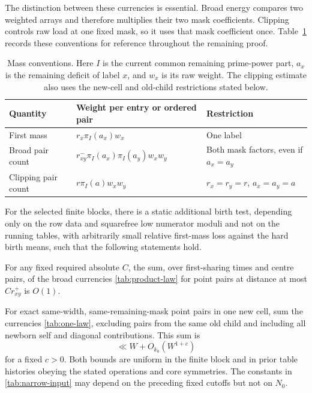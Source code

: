 The distinction between these currencies is essential. Broad energy
compares two weighted arrays and therefore multiplies their two mask
coefficients. Clipping controls raw load at one fixed mask, so it
uses that mask coefficient once. Table~\ref{tab:currency-map} records
these conventions for reference throughout the remaining proof.

\begin{table}[htbp]
\centering
\renewcommand{\arraystretch}{1.2}
\begin{tabular}{@{}p{.25\linewidth}p{.40\linewidth}p{.27\linewidth}@{}}
\toprule
Quantity & Weight per entry or ordered pair & Restriction \\
\midrule
First mass & $r_x\pi_I(a_x)w_x$ & One label \\
Broad pair count & $r_{xy}^-\pi_I(a_x)\pi_I(a_y)w_xw_y$
  & Both mask factors, even if $a_x=a_y$ \\
Clipping pair count & $r\pi_I(a)w_xw_y$
  & $r_x=r_y=r$, $a_x=a_y=a$ \\
\bottomrule
\end{tabular}
\caption{Mass conventions. Here $I$ is the current common remaining
prime-power part, $a_x$ is the remaining deficit of label $x$, and
$w_x$ is its raw weight. The clipping estimate also uses the new-cell
and old-child restrictions stated below.}
\label{tab:currency-map}
\end{table}

\begin{proposition}
\label{tab:first-join-input}
For the selected finite blocks, there is a static additional birth
test, depending only on the row data and squarefree low numerator
moduli and not on the running tables, with arbitrarily small relative
first-mass loss against the hard birth means, such that the following
statements hold.

For any fixed required absolute $C$, the sum, over first-sharing
times and centre pairs, of the broad currencies
\eqref{tab:product-law} for point pairs at distance at most
$Cr_{xy}^+$ is $O(1)$.

For exact same-width, same-remaining-mask point pairs in one new
cell, sum the currencies \eqref{tab:one-law}, excluding pairs from
the same old child and including all newborn self and diagonal
contributions.  This sum is
\begin{equation}
 \ll W+O_{k_0}(W^{1+c})
 \label{tab:narrow-input}
\end{equation}
for a fixed $c>0$.  Both bounds are uniform in the finite block and
in prior table histories obeying the stated operations and core
symmetries.  The constants in \eqref{tab:narrow-input} may depend on
the preceding fixed cutoffs but not on $N_0$.
\end{proposition}

